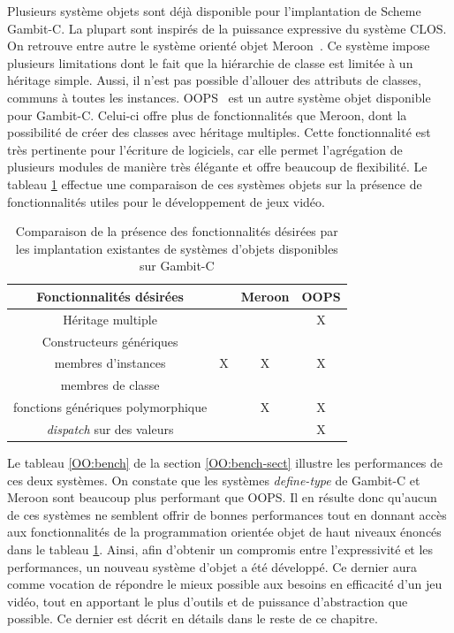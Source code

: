 \documentclass[12pt,oneside,letterpaper,francais]{book}
\newcommand{\scheme}[1]{\selectlanguage{english}{\tt #1}\selectlanguage{french}}
\begin{document}
Plusieurs système objets sont déjà disponible pour l'implantation de
Scheme Gambit-C. La plupart sont inspirés de la puissance expressive
du système CLOS. On retrouve entre autre le système orienté objet
Meroon~\cite{MEROON}. Ce système impose plusieurs limitations dont le
fait que la hiérarchie de classe est limitée à un héritage
simple. Aussi, il n'est pas possible d'allouer des attributs de
classes, communs à toutes les instances. OOPS~\cite{OOPS} est un autre
système objet disponible pour Gambit-C. Celui-ci offre plus de
fonctionnalités que Meroon, dont la possibilité de créer des classes
avec héritage multiples. Cette fonctionnalité est très pertinente pour
l'écriture de logiciels, car elle permet l'agrégation de plusieurs
modules de manière très élégante et offre beaucoup de flexibilité. Le
tableau \ref{OO:fonct-comp} effectue une comparaison de ces systèmes
objets sur la présence de fonctionnalités utiles pour le développement
de jeux vidéo.

\begin{table}
  \center
  \begin{tabular}{cccc}
    \hline
    Fonctionnalités désirées           & \scheme{define-type} & Meroon & OOPS\\
    \hline \hline
    Héritage multiple                  &                      &         & X\\
    Constructeurs génériques           &                      &         &  \\
    membres d'instances                & X                    & X       & X\\
    membres de classe                  &                      &         &  \\
    fonctions génériques polymorphique &                      & X       & X\\
    \textit{dispatch} sur des valeurs  &                      &         & X\\
    \hline
  \end{tabular}
  \caption{Comparaison de la présence des fonctionnalités désirées par
    les implantation existantes de systèmes d'objets disponibles sur
    Gambit-C}
  \label{OO:fonct-comp}
\end{table}

Le tableau \ref{OO:bench} de la section \ref{OO:bench-sect} illustre
les performances de ces deux systèmes. On constate que les systèmes
\textit{define-type} de Gambit-C et Meroon sont beaucoup plus
performant que OOPS. Il en résulte donc qu'aucun de ces systèmes ne
semblent offrir de bonnes performances tout en donnant accès aux
fonctionnalités de la programmation orientée objet de haut niveaux
énoncés dans le tableau \ref{OO:fonct-comp}. Ainsi, afin d'obtenir un
compromis entre l'expressivité et les performances, un nouveau système
d'objet a été développé. Ce dernier aura comme vocation de répondre le
mieux possible aux besoins en efficacité d'un jeu vidéo, tout en
apportant le plus d'outils et de puissance d'abstraction que
possible. Ce dernier est décrit en détails dans le reste de ce
chapitre.
\end{document}
